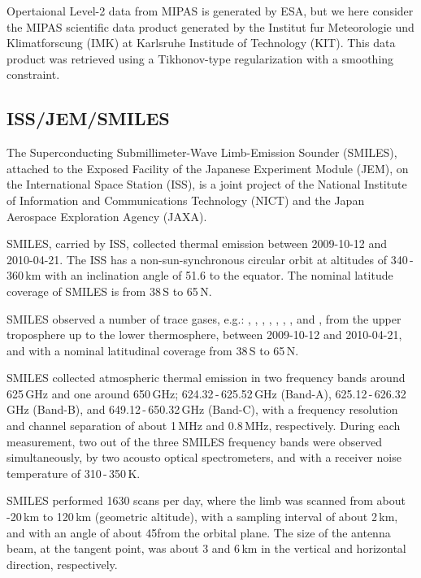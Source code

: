Opertaional Level-2 data from MIPAS is generated by ESA,
but we here consider the MIPAS scientific data product
generated by the Institut fur Meteorologie und Klimatforscung
(IMK) at Karlsruhe Institude of Technology (KIT).
This data product was retrieved using a Tikhonov-type
regularization with a smoothing constraint.


\subsection{ISS/JEM/SMILES}

The Superconducting Submillimeter-Wave Limb-Emission Sounder (SMILES),
attached to the Exposed Facility of the Japanese Experiment Module (JEM), 
on the International Space Station (ISS), is a joint project of the
National Institute of Information and Communications Technology (NICT) and
the Japan Aerospace Exploration Agency (JAXA).

SMILES, carried by ISS, collected thermal emission
between 2009-10-12 and 2010-04-21.
The ISS has a non-sun-synchronous circular orbit at
altitudes of 340\,-\,360\,km with an inclination angle of 51.6\degree
to the equator. The nominal latitude coverage of SMILES is from 38\degree\,S
to 65\degree\,N.

SMILES observed a number  
of trace gases, e.g.: , , , 
, , , , and , 
from the upper troposphere up to the lower thermosphere,  
between 2009-10-12 and 2010-04-21, and with a nominal latitudinal coverage 
from 38\degree\,S to 65\degree\,N.

SMILES collected atmospheric thermal emission in two frequency
bands around 625\,GHz and one around 650\,GHz;
624.32\,-\,625.52\,GHz (Band-A), 625.12\,-\,626.32\,GHz (Band-B),
and 649.12\,-\,650.32\,GHz (Band-C), with a frequency resolution
and channel separation of about 1\,MHz and 0.8\,MHz, 
respectively.  
During each measurement, two out of the three SMILES frequency
bands were observed simultaneously, by two acousto optical spectrometers,
and with a receiver noise temperature of 310\,-\,350\,K.

SMILES performed 1630 scans per day, where the limb was scanned
from about -20\,km to 120\,km (geometric altitude), 
with a sampling interval of about 2\,km, and with an angle of 
about 45\degree from the orbital plane. The size of the antenna beam, 
at the tangent point, was about 3 and 6\,km in the vertical and 
horizontal direction, respectively. 

